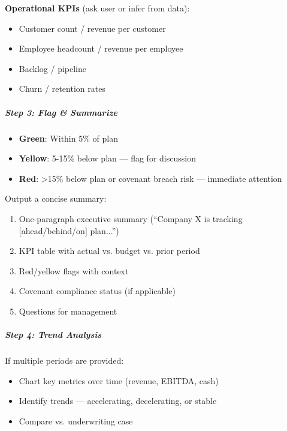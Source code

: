 \documentclass[11pt]{article}
\begin{document}
\textbf{Operational KPIs} (ask user or infer from data):

\begin{itemize}[leftmargin=*,itemsep=2pt,topsep=2pt]
\item {} Customer count / revenue per customer
\item {} Employee headcount / revenue per employee
\item {} Backlog / pipeline
\item {} Churn / retention rates
\end{itemize}

\subparagraph{Step 3: Flag \& Summarize}\mbox{}\par

\begin{itemize}[leftmargin=*,itemsep=2pt,topsep=2pt]
\item {} \textbf{Green}: Within 5\% of plan
\item {} \textbf{Yellow}: 5-15\% below plan — flag for discussion
\item {} \textbf{Red}: >15\% below plan or covenant breach risk — immediate attention
\end{itemize}

Output a concise summary:

\begin{enumerate}[leftmargin=*,itemsep=2pt,topsep=2pt]
\item {} One-paragraph executive summary (``Company X is tracking [ahead/behind/on] plan...'')
\item {} KPI table with actual vs. budget vs. prior period
\item {} Red/yellow flags with context
\item {} Covenant compliance status (if applicable)
\item {} Questions for management
\end{enumerate}

\subparagraph{Step 4: Trend Analysis}\mbox{}\par

If multiple periods are provided:

\begin{itemize}[leftmargin=*,itemsep=2pt,topsep=2pt]
\item {} Chart key metrics over time (revenue, EBITDA, cash)
\item {} Identify trends — accelerating, decelerating, or stable
\item {} Compare vs. underwriting case
\end{itemize}
\end{document}
